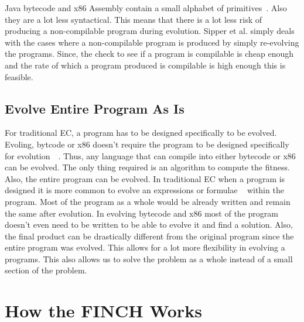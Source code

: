 \documentclass{sig-alternate}
\begin{document}
Java bytecode and x86 Assembly contain a small alphabet of primitives~\cite{Assembly:2010}. Also they are a lot less syntactical. This means that there is a lot less risk of producing a non-compilable program during evolution. Sipper et al.\cite{FINCH:2011} simply deals with the cases where a non-compilable program is produced by simply re-evolving the programs. Since, the check to see if a program is compilable is cheap enough and the rate of which a program produced is compilable is high enough this is feasible. 

\subsection{Evolve Entire Program As Is}
For traditional EC, a program has to be designed specifically to be evolved. Evoling, bytcode or x86 doesn't require the program to be designed specifically for evolution~\cite{Assembly:2010}~\cite{FINCH:2011}. Thus, any language that can compile into either bytecode or x86 can be evolved. The only thing required is an algorithm to compute the fitness. Also, the entire program can be evolved. In traditional EC when a program is designed it is more common to evolve an expressions or formulae ~\cite{FINCH:2011} within the program. Most of the program as a whole would be already written and remain the same after evolution. In evolving bytecode and x86 most of the program doesn't even need to be written to be able to evolve it and find a solution. Also, the final product can be drastically different from the original program since the entire program was evolved. This allows for a lot more flexibility in evolving a programs. This also allows us to solve the problem as a whole instead of a small section of the problem.


\section{How the FINCH Works}
\end{document}
